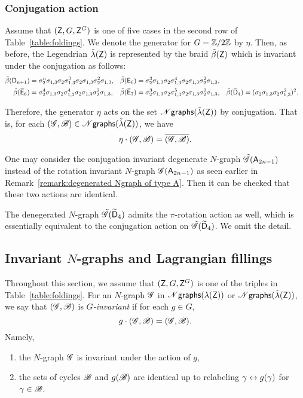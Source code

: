 \subsubsection{Conjugation action}
Assume that $(\mathsf{Z}, G, {\mathsf{Z}^G})$ is one of five cases in the second row of Table~\ref{table:foldings}.
We denote the generator for $G=\mathbb{Z}/2\mathbb{Z}$ by $\eta$.
Then, as before, the Legendrian $\tilde{\lambda}(\mathsf{Z})$ is represented by the braid $\tilde\beta(\mathsf{Z})$ which is invariant under the conjugation as follows:
\begin{align*}
\tilde\beta(\mathsf{D}_{n+1})&=\sigma_2^n \sigma_{1,3}\sigma_2\sigma_{1,3}^3 \sigma_2\sigma_{1,3}\sigma_2^2\sigma_{1,3},&
\tilde\beta(\mathsf{E}_6)&=\sigma_2^3 \sigma_{1,3}\sigma_2\sigma_{1,3}^4 \sigma_2\sigma_{1,3}\sigma_2^2\sigma_{1,3},\\
\tilde\beta(\widetilde{\mathsf{E}}_6)&=\sigma_2^4 \sigma_{1,3}\sigma_2\sigma_{1,3}^4 \sigma_2\sigma_{1,3}\sigma_2^2\sigma_{1,3},&
\tilde\beta(\widetilde{\mathsf{E}}_7)&=\sigma_2^3 \sigma_{1,3}\sigma_2\sigma_{1,3}^5 \sigma_2\sigma_{1,3}\sigma_2^2\sigma_{1,3},&
\tilde\beta(\widetilde{\mathsf{D}}_4)&=(\sigma_2\sigma_{1,3}\sigma_2\sigma_{1,3}^2)^2.
\end{align*}

Therefore, the generator $\eta$ acts on the set $\mathscr{N}\mathsf{graphs}(\tilde{\lambda}(\mathsf{Z}))$ by conjugation.
That is, for each $(\mathscr{G}, \mathscr{B})\in\mathscr{N}\mathsf{graphs}(\tilde{\lambda}(\mathsf{Z}))$, we have
\[
\eta\cdot (\mathscr{G}, \mathscr{B}) = \overline{(\mathscr{G}, \mathscr{B})}.
\]

\begin{remark}
One may consider the conjugation invariant degenerate $N$-graph $\tilde{\mathscr{G}}(\mathsf{A}_{2n-1})$ instead of the rotation invariant $N$-graph $\mathscr{G}(\mathsf{A}_{2n-1})$ as seen earlier in Remark~\ref{remark:degenerated Ngraph of type A}. 
Then it can be checked that these two actions are identical.
\end{remark}

\begin{remark}
The denegerated $N$-graph $\tilde{\mathscr{G}}(\widetilde{\mathsf{D}}_4)$ admits the $\pi$-rotation action as well, which is essentially equivalent to the conjugation action on $\tilde{\mathscr{G}}(\widetilde{\mathsf{D}}_4)$. We omit the detail.
\end{remark}


\subsection{Invariant \texorpdfstring{$N$}{N}-graphs and Lagrangian fillings}
Throughout this section, we assume that $(\mathsf{Z}, G, {\mathsf{Z}^G})$ is one of the triples in Table~\ref{table:foldings}.
For an $N$-graph $\mathscr{G}$ in $\mathscr{N}\mathsf{graphs}(\lambda(\mathsf{Z}))$ or  $\mathscr{N}\mathsf{graphs}(\tilde{\lambda}(\mathsf{Z}))$, we say that $(\mathscr{G}, \mathscr{B})$ is \emph{$G$-invariant} if for each $g\in G$,
\[
g\cdot(\mathscr{G}, \mathscr{B}) = (\mathscr{G}, \mathscr{B}).
\]
Namely,
\begin{enumerate}
\item the $N$-graph $\mathscr{G}$ is invariant under the action of $g$,
\item the sets of cycles $\mathscr{B}$ and $g(\mathscr{B})$ are identical up to relabeling $\gamma \leftrightarrow g(\gamma)$ for $\gamma\in\mathscr{B}$.
\end{enumerate}

